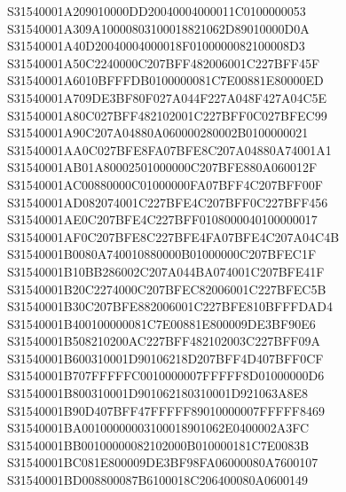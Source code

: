 \documentclass[12pt,a4paper]{article}
\begin{document}
\begin{framed}
{S31540001A209010000DD20040004000011C0100000053\newline
S31540001A309A10000803100018821062D89010000D0A\newline
S31540001A40D20040004000018F0100000082100008D3\newline
S31540001A50C2240000C207BFF482006001C227BFF45F\newline
S31540001A6010BFFFDB0100000081C7E00881E80000ED\newline
S31540001A709DE3BF80F027A044F227A048F427A04C5E\newline
S31540001A80C027BFF482102001C227BFF0C027BFEC99\newline
S31540001A90C207A04880A060000280002B0100000021\newline
S31540001AA0C027BFE8FA07BFE8C207A04880A74001A1\newline
S31540001AB01A80002501000000C207BFE880A060012F\newline
S31540001AC00880000C01000000FA07BFF4C207BFF00F\newline
S31540001AD082074001C227BFE4C207BFF0C227BFF456\newline
S31540001AE0C207BFE4C227BFF0108000040100000017\newline
S31540001AF0C207BFE8C227BFE4FA07BFE4C207A04C4B\newline
S31540001B0080A740010880000B01000000C207BFEC1F\newline
S31540001B10BB286002C207A044BA074001C207BFE41F\newline
S31540001B20C2274000C207BFEC82006001C227BFEC5B\newline
S31540001B30C207BFE882006001C227BFE810BFFFDAD4\newline
S31540001B400100000081C7E00881E800009DE3BF90E6\newline
S31540001B508210200AC227BFF482102003C227BFF09A\newline
S31540001B600310001D90106218D207BFF4D407BFF0CF\newline
S31540001B707FFFFFC0010000007FFFFF8D01000000D6\newline
S31540001B800310001D901062180310001D921063A8E8\newline
S31540001B90D407BFF47FFFFF89010000007FFFFF8469\newline
S31540001BA00100000003100018901062E0400002A3FC\newline
S31540001BB00100000082102000B010000181C7E0083B\newline
S31540001BC081E800009DE3BF98FA06000080A7600107\newline
S31540001BD008800087B6100018C206400080A0600149\newline
}
\end{framed}
\end{document}
